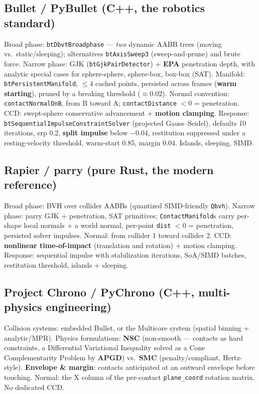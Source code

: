 \documentclass[11pt]{article}
\newcommand{\code}[1]{\texttt{#1}}
\begin{document}
\subsection{Bullet / PyBullet (C++, the robotics standard)}
Broad phase: \code{btDbvtBroadphase} --- \emph{two} dynamic AABB trees (moving
vs.\ static/sleeping); alternatives \code{btAxisSweep3} (sweep-and-prune) and
brute force. Narrow phase: GJK (\code{btGjkPairDetector}) + \textbf{EPA}
penetration depth, with analytic special cases for sphere-sphere, sphere-box,
box-box (SAT). Manifold: \code{btPersistentManifold}, $\le 4$ cached points,
persisted across frames (\textbf{warm starting}), pruned by a breaking
threshold ($\approx 0.02$). Normal convention: \code{contactNormalOnB}, from B
toward A; \code{contactDistance} $< 0$ = penetration. CCD: swept-sphere
conservative advancement + \textbf{motion clamping}. Response:
\code{btSequentialImpulseConstraintSolver} (projected Gauss--Seidel), defaults
10 iterations, erp 0.2, \textbf{split impulse} below $-0.04$, restitution
suppressed under a resting-velocity threshold, warm-start 0.85, margin 0.04.
Islands, sleeping, SIMD.

\subsection{Rapier / parry (pure Rust, the modern reference)}
Broad phase: BVH over collider AABBs (quantized SIMD-friendly \code{Qbvh}).
Narrow phase: parry GJK + penetration, SAT primitives; \code{ContactManifold}s
carry per-shape local normals + a world normal, per-point \code{dist} $< 0$ =
penetration, persisted solver impulses. Normal: from collider 1 toward
collider 2. CCD: \textbf{nonlinear time-of-impact} (translation and rotation)
+ motion clamping. Response: sequential impulse with stabilization iterations,
SoA/SIMD batches, restitution threshold, islands + sleeping.

\subsection{Project Chrono / PyChrono (C++, multi-physics engineering)}
Collision systems: embedded Bullet, or the Multicore system (spatial binning +
analytic/MPR). Physics formulations: \textbf{NSC} (non-smooth --- contacts as
hard constraints, a Differential Variational Inequality solved as a Cone
Complementarity Problem by \textbf{APGD}) vs.\ \textbf{SMC} (penalty/compliant,
Hertz-style). \textbf{Envelope \& margin}: contacts anticipated at an outward
envelope before touching. Normal: the X column of the per-contact
\code{plane\_coord} rotation matrix. No dedicated CCD.
\end{document}
